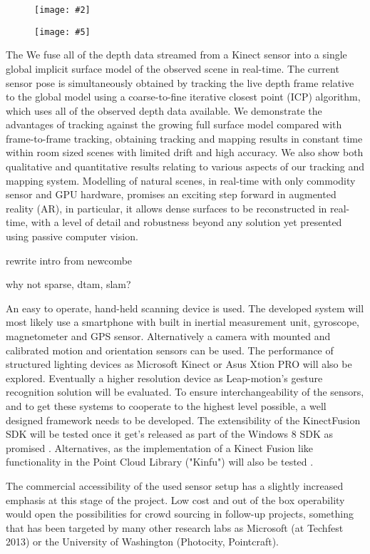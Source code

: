 \documentclass{ucl_thesis}
\newcommand{\myfig}[6]{%
\begin{figure}[h!]\centering%
	\begin{minipage}[b]{0.49\linewidth}\centering%
		\texttt{[image: \#2]}%
		\caption{#3}%
		\label{fig:#1}%
	\end{minipage}%
	\begin{minipage}[b]{0.49\linewidth}\centering%
		\texttt{[image: \#5]}%
		\caption{#6}%
		\label{fig:#4}%
	\end{minipage}%
\end{figure}%
}
\begin{document}
\myfig
{fig:kinfu_baseline}
{/home/bontius/workspace/cpp_projects/KinfuSuperRes/thesis/img/kinfu_baseline00.png}
{PCL\'s Kinfu output of scene recorded by us}
{fig:lefloch}
{/home/bontius/workspace/cpp_projects/KinfuSuperRes/thesis/img/lefloch_largescale.png}
{\citep{keller13realtime}}

The 
We fuse all of the depth data streamed from a Kinect sensor into
a single global implicit surface model of the observed scene in
real-time. The current sensor pose is simultaneously obtained by
tracking the live depth frame relative to the global model using a
coarse-to-fine iterative closest point (ICP) algorithm, which uses
all of the observed depth data available. We demonstrate the advantages
of tracking against the growing full surface model compared
with frame-to-frame tracking, obtaining tracking and mapping results
in constant time within room sized scenes with limited drift
and high accuracy. We also show both qualitative and quantitative
results relating to various aspects of our tracking and mapping system.
Modelling of natural scenes, in real-time with only commodity
sensor and GPU hardware, promises an exciting step forward
in augmented reality (AR), in particular, it allows dense surfaces to
be reconstructed in real-time, with a level of detail and robustness
beyond any solution yet presented using passive computer vision.

rewrite intro from newcombe

why not sparse, dtam, slam?

\par An easy to operate, hand-held scanning device is used. The developed system will most likely use a smartphone with built in inertial measurement unit, gyroscope, magnetometer and GPS sensor. Alternatively a camera with mounted and calibrated motion and orientation sensors can be used. The performance of structured lighting devices as Microsoft Kinect \cite{Kinect} or Asus Xtion PRO \cite{XtionPro} will also be explored. Eventually a higher resolution device as Leap-motion's gesture recognition solution \cite{LeapMotion} will be evaluated. To ensure interchangeability of the sensors, and to get these systems to cooperate to the highest level possible, a well designed framework needs to be developed. The extensibility of the KinectFusion SDK will be tested once it get's released as part of the Windows 8 SDK as promised \cite{SDKKinectFusion}. Alternatives, as the implementation of a Kinect Fusion like functionality in the Point Cloud Library ("Kinfu") will also be tested \cite{KinFu}.
\par The commercial accessibility of the used sensor setup has a slightly increased emphasis at this stage of the project. Low cost and out of the box operability would open the possibilities for crowd sourcing in follow-up projects, something that has been targeted by many other research labs as Microsoft (at Techfest 2013) or the University of Washington (Photocity, Pointcraft).
\end{document}
